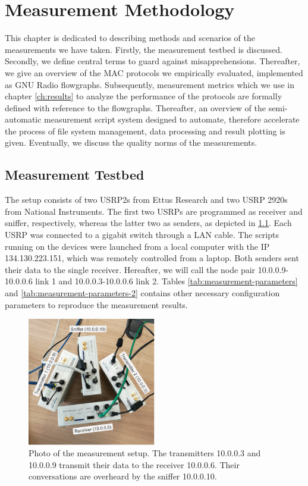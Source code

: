 \chapter{Measurement Methodology}
\label{ch:methodology}

This chapter is dedicated to describing methods and scenarios of the measurements we have taken. Firstly, the measurement testbed is discussed. Secondly, we define central terms to guard against misapprehensions. Thereafter, we give an overview of the MAC protocols we empirically evaluated, implemented as GNU Radio flowgraphs. Subsequently, measurement metrics which we use in chapter \ref{ch:results} to analyze the performance of the protocols are formally defined with reference to the flowgraphs. Thereafter, an overview of the semi-automatic measurement script system designed to automate, therefore accelerate the process of file system management, data processing and result plotting is given. Eventually, we discuss the quality norms of the measurements.

\section{Measurement Testbed}

The setup consists of two USRP2s from Ettus Research and two USRP 2920s from National Instruments. The first two USRPs are programmed as receiver and sniffer, respectively, whereas the latter two as senders, as depicted in \ref{fig:measurement-setup}. Each USRP was connected to a gigabit switch through a LAN cable. The scripts running on the devices were launched from a local computer with the IP 134.130.223.151, which was remotely controlled from a laptop. Both senders sent their data to the single receiver. Hereafter, we will call the node pair 10.0.0.9-10.0.0.6 link 1 and 10.0.0.3-10.0.0.6 link 2. Tables \ref{tab:measurement-parameters} and \ref{tab:measurement-parameters-2}  contains other necessary configuration parameters to reproduce the measurement results.

\begin{figure}[tb]
	\label{fig:measurement-setup}
	\begin{center}
		\includegraphics[width=0.5\textwidth]{pictures/measurement_setup}
	\end{center}
	\caption{Photo of the measurement setup. The transmitters 10.0.0.3 and 10.0.0.9 transmit their data to the receiver 10.0.0.6. Their conversations are overheard by the sniffer 10.0.0.10.}
\end{figure}

